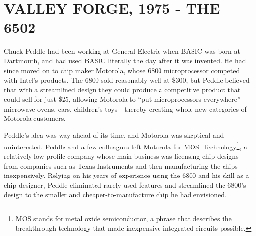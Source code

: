 
\section{VALLEY FORGE, 1975 - THE 6502}


Chuck Peddle had been working at General Electric when BASIC was
born at Dartmouth, and had used BASIC literally the day
after it was invented.
He had since moved on to chip maker Motorola, whose 6800
microprocessor competed with Intel's products.
The 6800 sold reasonably well at \$300, but
Peddle  believed that with a streamlined design they could
produce a competitive product that could sell for just \$25,
allowing Motorola to ``put
microprocessors everywhere''~\cite[p. 31]{commodore}---microwave ovens,
cars, children's toys---thereby creating whole new categories of Motorola customers.

Peddle's idea was way ahead of its time, and Motorola was skeptical
and uninterested.  Peddle and a few  
colleagues left Motorola for MOS~Technology\footnote{MOS stands
for metal oxide semiconductor, a phrase that describes the
breakthrough technology that made inexpensive integrated circuits
possible.}, a relatively low-profile company whose main business was
licensing chip designs from companies such as Texas Instruments and then
manufacturing the chips inexpensively.
Relying on his years of experience using the 6800
and his skill as a chip designer, Peddle eliminated
rarely-used features and streamlined the 6800's design to
the smaller and cheaper-to-manufacture chip
he had envisioned.

